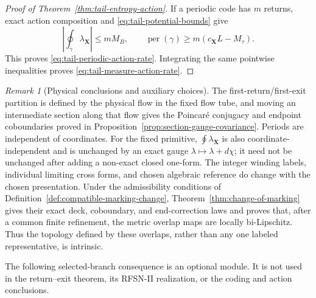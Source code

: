 \documentclass[11pt]{amsart}
\numberwithin{equation}{section}
\theoremstyle{definition}
\theoremstyle{remark}
\newtheorem{remark}[theorem]{Remark}
\begin{document}
\begin{proof}[Proof of Theorem~\ref{thm:tail-entropy-action}]
If a periodic code has $m$ returns, exact action composition and
\eqref{eq:tail-potential-bounds} give
\[
 \left|\oint_\gamma\lambda_{\mathbf X}\right|\le mM_B,
 \qquad
 \operatorname{per}(\gamma)\ge m(c_{\mathbf X}L-M_\tau).
\]
This proves \eqref{eq:tail-periodic-action-rate}.  Integrating the same
pointwise inequalities proves \eqref{eq:tail-measure-action-rate}.
\end{proof}

\begin{remark}[Physical conclusions and auxiliary choices]
The first-return/first-exit partition is defined by the physical flow in
the fixed flow tube, and moving an intermediate section along that flow
gives the Poincar\'e conjugacy and endpoint coboundaries proved in
Proposition~\ref{prop:section-gauge-covariance}.  Periods are independent
of coordinates.  For the fixed primitive, $\oint\lambda_{\mathbf X}$ is
also coordinate-independent and is unchanged by an exact gauge
$\lambda\mapsto\lambda+d\chi$; it need not be unchanged after adding a
non-exact closed one-form.  The integer winding labels, individual limiting
cross forms, and chosen algebraic reference do change with the chosen
presentation.  Under the admissibility conditions of
Definition~\ref{def:compatible-marking-change},
Theorem~\ref{thm:change-of-marking} gives their exact deck, coboundary, and
end-correction laws and proves that, after a common finite refinement, the
metric overlap maps are locally bi-Lipschitz.  Thus the topology defined by
these overlaps, rather than any one labeled representative, is intrinsic.
\end{remark}

The following selected-branch consequence is an optional module.  It is not
used in the return--exit theorem, its RFSN-II realization, or the coding and
action conclusions.
\end{document}
